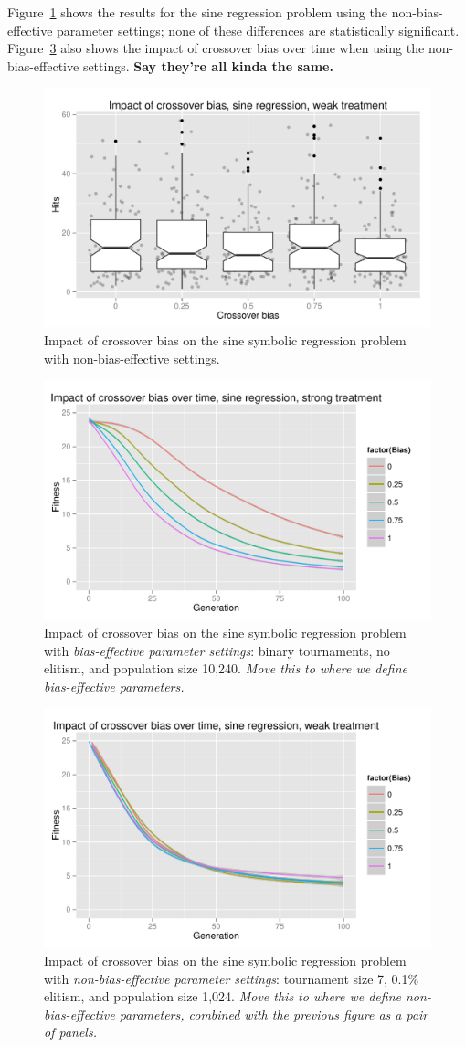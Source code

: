 \documentclass{sig-alternate}
\begin{document}
Figure~\ref{fig:sineBiasResultsWeak} shows the results for the sine regression problem using the non-bias-effective 
parameter settings; none of these differences are statistically significant. Figure~\ref{fig:sineBiasFitnessVsGenWeak} also shows the impact of crossover bias over time when using the non-bias-effective settings. \textbf{Say they're all kinda the same.}

\begin{figure}
\centering
\includegraphics[width=0.45 \textwidth]{Plots/Sine_XO_impact_weak_boxplot.pdf}
\caption{Impact of crossover bias on the sine symbolic regression problem with non-bias-effective settings.}
\label{fig:sineBiasResultsWeak}
\end{figure}

\begin{figure}
\centering
\includegraphics[width=0.45 \textwidth]{Plots/Sine_XO_fitness_vs_gen_strong.pdf}
\caption{Impact of crossover bias on the sine symbolic regression problem with \emph{bias-effective parameter settings}: binary tournaments, no elitism, and 
population size 10,240. \emph{Move this to where we define bias-effective parameters.}}
\label{fig:sineBiasFitnessVsGenStrong}
\end{figure}

\begin{figure}
\centering
\includegraphics[width=0.45 \textwidth]{Plots/Sine_XO_fitness_vs_gen_weak.pdf}
\caption{Impact of crossover bias on the sine symbolic regression problem with \emph{non-bias-effective parameter settings}: tournament size 7, 0.1\% elitism, and 
population size 1,024.  \emph{Move this to where we define non-bias-effective parameters, combined with the previous figure as a pair of panels.}}
\label{fig:sineBiasFitnessVsGenWeak}
\end{figure}
\end{document}
